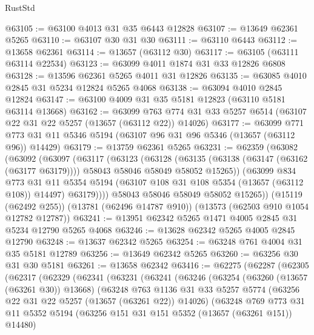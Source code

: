 \begin{lexlean}{RustStd}
\begin{coremodule}
@63105 := @63100 @4013 @31 @35 @6443 @12828
@63107 := @13649 @62361 @5265
@63110 := @63107 @30 @31 @30
@63111 := @63110 @6443
@63112 := @13658 @62361
@63114 := @13657 (@63112 @30)
@63117 := @63105 (@63111 @63114 @22534)
@63123 := @63099 @4011 @1874 @31 @33 @12826 @6808
@63128 := @13596 @62361 @5265 @4011 @31 @12826
@63135 := @63085 @4010 @2845 @31 @5234 @12824 @5265 @4068
@63138 := @63094 @4010 @2845 @12824
@63147 := @63100 @4009 @31 @35 @5181 @12823 (@63110 @5181 @63114 @13668)
@63162 := @63099
    @763
    @774
    @31
    @33
    @5257
    @6514
    (@63107 @22 @31 @22 @5257 (@13657 (@63112 @22)) @14026)
@63177 := @63099
    @771
    @773
    @31
    @11
    @5346
    @5194
    (@63107 @96 @31 @96 @5346 (@13657 (@63112 @96)) @14429)
@63179 := @13759 @62361 @5265
@63231 := @62359
    (@63082
      (@63092
        (@63097
          (@63117
            (@63123
              (@63128
                (@63135
                  (@63138 (@63147 (@63162 (@63177 @63179))))
                  @58043
                  @58046
                  @58049
                  @58052
                  @15265))
              (@63099
                @834
                @773
                @31
                @11
                @5354
                @5194
                (@63107 @108 @31 @108 @5354 (@13657 (@63112 @108)) @14497)
                @63179))))
        @58043
        @58046
        @58049
        @58052
        @15265))
    (@15119 (@62492 @255))
    (@13781 (@62496 @14787 @910))
    (@13573 (@62503 @910 @1054 @12782 @12787))
@63241 := @13951 @62342 @5265 @1471 @4005 @2845 @31 @5234 @12790 @5265 @4068
@63246 := @13628 @62342 @5265 @4005 @2845 @12790
@63248 := @13637 @62342 @5265
@63254 := @63248 @761 @4004 @31 @35 @5181 @12789
@63256 := @13649 @62342 @5265
@63260 := @63256 @30 @31 @30 @5181
@63261 := @13658 @62342
@63416 := @62275
    (@62287
      (@62305
        (@62317
          (@62329
            (@62341
              (@63231
                (@63241
                  (@63246
                    (@63254
                      (@63260 (@13657 (@63261 @30)) @13668)
                      (@63248
                        @763
                        @1136
                        @31
                        @33
                        @5257
                        @5774
                        (@63256 @22 @31 @22 @5257 (@13657 (@63261 @22)) @14026)
                        (@63248
                          @769
                          @773
                          @31
                          @11
                          @5352
                          @5194
                          (@63256 @151 @31 @151 @5352 (@13657 (@63261 @151)) @14480)

\end{coremodule}
\end{lexlean}
